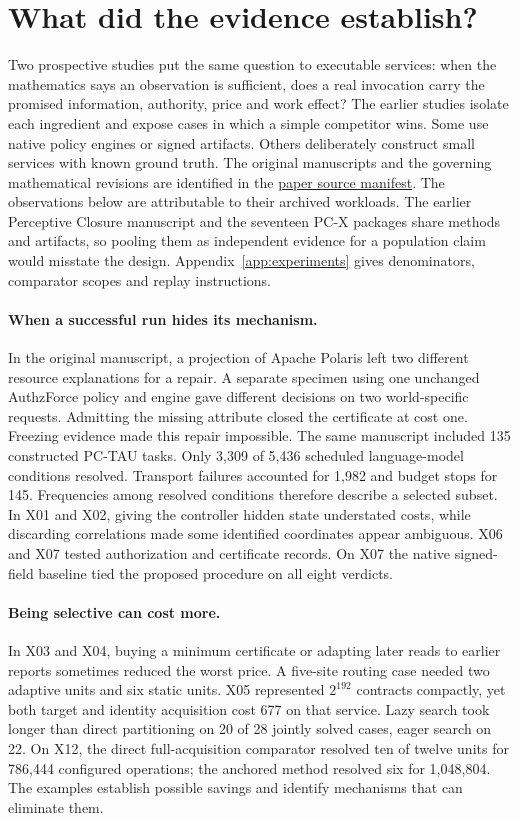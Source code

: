 \section{What did the evidence establish?}\label{sec:experiments}
Two prospective studies put the same question to executable services: when the mathematics says an observation is sufficient, does a real invocation carry the promised information, authority, price and work effect? The earlier studies isolate each ingredient and expose cases in which a simple competitor wins. Some use native policy engines or signed artifacts. Others deliberately construct small services with known ground truth. The original manuscripts and the governing mathematical revisions are identified in the \href{https://github.com/Perceptive-Closure/PC-X/blob/664f90e2d2e2c941bed36e43240811cfc33ef0ac/PAPER/SOURCE-MANIFEST.md}{paper source manifest}. The observations below are attributable to their archived workloads. The earlier Perceptive Closure manuscript and the seventeen PC-X packages share methods and artifacts, so pooling them as independent evidence for a population claim would misstate the design. Appendix~\ref{app:experiments} gives denominators, comparator scopes and replay instructions.

\paragraph{When a successful run hides its mechanism.}
In the original manuscript, a projection of Apache Polaris left two different resource explanations for a repair. A separate specimen using one unchanged AuthzForce policy and engine gave different decisions on two world-specific requests. Admitting the missing attribute closed the certificate at cost one. Freezing evidence made this repair impossible. The same manuscript included 135 constructed PC-TAU tasks. Only 3,309 of 5,436 scheduled language-model conditions resolved. Transport failures accounted for 1,982 and budget stops for 145. Frequencies among resolved conditions therefore describe a selected subset. In X01 and X02, giving the controller hidden state understated costs, while discarding correlations made some identified coordinates appear ambiguous. X06 and X07 tested authorization and certificate records. On X07 the native signed-field baseline tied the proposed procedure on all eight verdicts.

\paragraph{Being selective can cost more.}
In X03 and X04, buying a minimum certificate or adapting later reads to earlier reports sometimes reduced the worst price. A five-site routing case needed two adaptive units and six static units. X05 represented \(2^{192}\) contracts compactly, yet both target and identity acquisition cost 677 on that service. Lazy search took longer than direct partitioning on 20 of 28 jointly solved cases, eager search on 22. On X12, the direct full-acquisition comparator resolved ten of twelve units for 786,444 configured operations; the anchored method resolved six for 1,048,804. The examples establish possible savings and identify mechanisms that can eliminate them.

